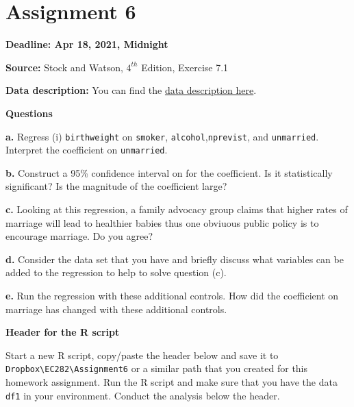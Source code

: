 \documentclass[
]{book}
\begin{document}
\hypertarget{assignment-6}{%
\section{Assignment 6}\label{assignment-6}}

\textbf{Deadline: Apr 18, 2021, Midnight}

\textbf{Source:} Stock and Watson, \(4^{th}\) Edition, Exercise 7.1

\textbf{Data description:} You can find the \href{https://www.dropbox.com/s/s0q564v6lplbexu/Birthweight_Smoking_Description.pdf?dl=1}{data description here}.

\textbf{Questions}

\textbf{a.} Regress (i) \texttt{birthweight} on \texttt{smoker}, \texttt{alcohol},\texttt{nprevist}, and \texttt{unmarried}. Interpret the coefficient on \texttt{unmarried}.

\textbf{b.} Construct a 95\% confidence interval on for the coefficient. Is it statistically significant? Is the magnitude of the coefficient large?

\textbf{c.} Looking at this regression, a family advocacy group claims that higher rates of marriage will lead to healthier babies thus one obviuous public policy is to encourage marriage. Do you agree?

\textbf{d.} Consider the data set that you have and briefly discuss what variables can be added to the regression to help to solve question (c).

\textbf{e.} Run the regression with these additional controls. How did the coefficient on marriage has changed with these additional controls.

\textbf{Header for the R script}

Start a new R script, copy/paste the header below and save it to \texttt{Dropbox\textbackslash{}EC282\textbackslash{}Assignment6} or a similar path that you created for this homework assignment. Run the R script and make sure that you have the data \texttt{df1} in your environment. Conduct the analysis below the header.
\end{document}
